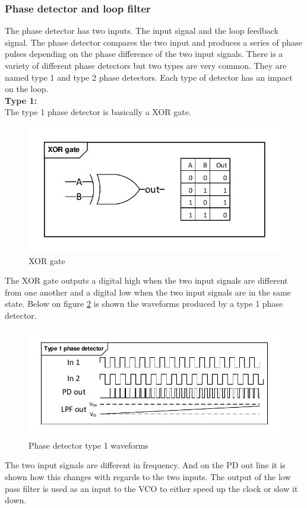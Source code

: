 \subsubsection{Phase detector and loop filter}
The phase detector has two inputs. The input signal and the loop feedback signal. The phase detector compares the two input and produces a series of phase pulses depending on the phase difference of the two input signals. There is a variety of different phase detectors but two types are very common. They are named type 1 and type 2 phase detectors. Each type of detector has an impact on the loop.
\\ \textbf{Type 1:}\\
The type 1 phase detector is basically a XOR gate. 
\begin{figure}[H]
	\centering
	\includegraphics[width=.6\textwidth]{billeder/10technologystudies/XORgate}
	\caption{XOR gate}
	\label{fig:XOR}
\end{figure}
The XOR gate outputs a digital high when the two input signals are different from one another and a digital low when the two input signals are in the same state. Below on figure \ref{fig:pd1_waveforms} is shown the waveforms produced by a type 1 phase detector.
\begin{figure}[H]
	\centering
	\includegraphics[width=.8\textwidth]{billeder/10technologystudies/PD1_waveforms}
	\caption{Phase detector type 1 waveforms}
	\label{fig:pd1_waveforms}
\end{figure}
The two input signals are different in frequency. And on the PD out line it is shown how this changes with regards to the two inputs.  The output of the low pass filter is used as an input to the VCO to either speed up the clock or slow it down.\\
